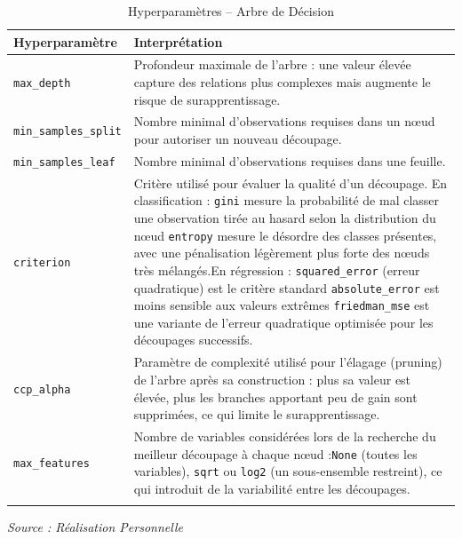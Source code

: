 \documentclass[a4paper,12pt, oneside]{article}
\begin{document}
\begin{longtable}{|m{5cm}|m{12cm}|}
\hline
\textbf{Hyperparamètre} & \textbf{Interprétation} \\
\hline
\texttt{max\_depth} & Profondeur maximale de l'arbre : une valeur élevée capture des relations plus complexes mais augmente le risque de surapprentissage. \\
\hline
\texttt{min\_samples\_split} & Nombre minimal d'observations requises dans un nœud pour autoriser un nouveau découpage. \\
\hline
\texttt{min\_samples\_leaf} & Nombre minimal d'observations requises dans une feuille. \\
\hline
\texttt{criterion} & Critère utilisé pour évaluer la qualité d'un découpage. \newline En classification : \newline \texttt{gini} mesure la probabilité de mal classer une observation tirée au hasard selon la distribution du nœud \newline \texttt{entropy} mesure le désordre des classes présentes, avec une pénalisation légèrement plus forte des nœuds très mélangés.\newline En régression : \newline \texttt{squared\_error} (erreur quadratique) est le critère standard \newline \texttt{absolute\_error} est moins sensible aux valeurs extrêmes \newline \texttt{friedman\_mse} est une variante de l'erreur quadratique optimisée pour les découpages successifs. \\
\hline
\texttt{ccp\_alpha} & Paramètre de complexité utilisé pour l'élagage (pruning) de l'arbre après sa construction : plus sa valeur est élevée, plus les branches apportant peu de gain sont supprimées, ce qui limite le surapprentissage. \\
\hline
\texttt{max\_features} & Nombre de variables considérées lors de la recherche du meilleur découpage à chaque nœud :\newline \texttt{None} (toutes les variables), \newline \texttt{sqrt} ou \texttt{log2} (un sous-ensemble restreint), ce qui introduit de la variabilité entre les découpages. \\
\hline
\caption{Hyperparamètres -- Arbre de Décision}
\end{longtable}
\begin{center}
\vspace{-0.85cm}
\textit{Source : Réalisation Personnelle}
\end{center}
\end{document}
